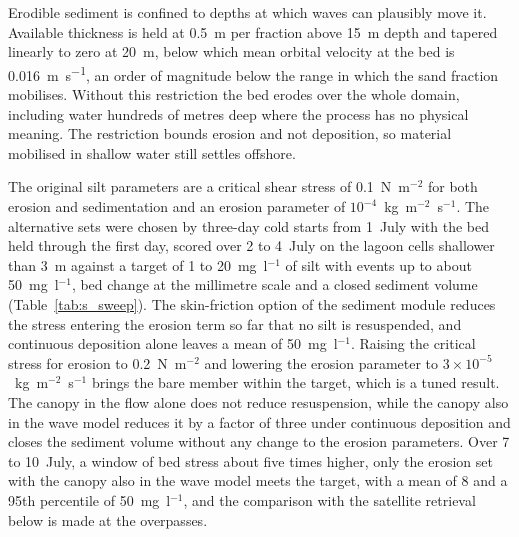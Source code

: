\documentclass[12pt]{article}
\begin{document}
Erodible sediment is confined to depths at which waves can plausibly move it.
Available thickness is held at 0.5~m per fraction above 15~m depth and tapered
linearly to zero at 20~m, below which mean orbital velocity at the bed is
0.016~\si{\metre\per\second}, an order of magnitude below the range in which
the sand fraction mobilises. Without this restriction the bed erodes over the
whole domain, including water hundreds of metres deep where the process has no
physical meaning. The restriction bounds erosion and not deposition, so
material mobilised in shallow water still settles offshore.

The original silt parameters are a critical shear stress of 0.1~N~m$^{-2}$ for
both erosion and sedimentation and an erosion parameter of
$10^{-4}$~kg~m$^{-2}$~s$^{-1}$. The alternative sets were chosen by three-day
cold starts from 1~July with the bed held through the first day, scored over 2
to 4~July on the lagoon cells shallower than 3~m against a target of 1 to
20~mg~l$^{-1}$ of silt with events up to about 50~mg~l$^{-1}$, bed change at
the millimetre scale and a closed sediment volume (Table~\ref{tab:s_sweep}).
The skin-friction option of the sediment module reduces the stress entering the erosion
term so far that no silt is resuspended, and continuous deposition alone leaves
a mean of 50~mg~l$^{-1}$. Raising the critical stress for erosion to
0.2~N~m$^{-2}$ and lowering the erosion parameter to
$3\times10^{-5}$~kg~m$^{-2}$~s$^{-1}$ brings the bare member within the target,
which is a tuned result. The canopy in the flow alone does not reduce
resuspension, while the canopy also in the wave model reduces it by a factor of
three under continuous deposition and closes the sediment volume without any
change to the erosion parameters. Over 7 to 10~July, a window of bed stress
about five times higher, only the erosion set with the canopy also in the wave
model meets the target, with a mean of 8 and a 95th percentile of
50~mg~l$^{-1}$, and the comparison with the satellite retrieval below is made
at the overpasses.
\end{document}
